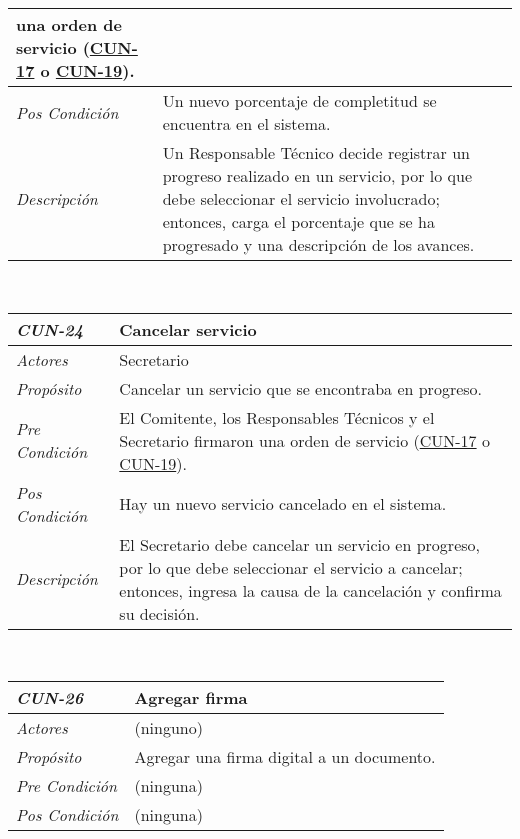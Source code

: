 \begin{center}
{\begin{tabular}{ | p{3cm} | p{12.5cm} | }
	una orden de servicio
	(\hyperlink{CUN-17}{CUN-17} o
	\hyperlink{CUN-19}{CUN-19}). \\
	\hline
	\raggedleft \textit{Pos Condici\'on} & Un nuevo
	porcentaje de completitud se encuentra en el sistema. \\
	\hline
	\raggedleft \textit{Descripci\'on} &
	Un Responsable T\'ecnico decide registrar un progreso
	realizado en un servicio, por lo que debe
	seleccionar el servicio involucrado; entonces, carga
	el porcentaje que se ha progresado y una descripci\'on
	de los avances. \\
	\hline
\end{tabular}} \\[1cm]
\hypertarget{CUN-24}{%
\begin{tabular}{ | p{3cm} | p{12.5cm} | }
	\hline
	\rowcolor{lightgray}
	\hfil \textbf{\textit{CUN-24}} &
	\hfil \textbf{Cancelar servicio} \\
	\hline
	\raggedleft \textit{Actores} & Secretario \\
	\hline
	\raggedleft \textit{Prop\'osito} & Cancelar un
	servicio que se encontraba en progreso. \\
	\hline
	\raggedleft \textit{Pre Condici\'on} & El Comitente,
	los Responsables T\'ecnicos y el Secretario firmaron
	una orden de servicio
	(\hyperlink{CUN-17}{CUN-17} o
	\hyperlink{CUN-19}{CUN-19}). \\
	\hline
	\raggedleft \textit{Pos Condici\'on} & Hay un nuevo
	servicio cancelado en el sistema. \\
	\hline
	\raggedleft \textit{Descripci\'on} &
	El Secretario debe cancelar un servicio en progreso,
	por lo que debe seleccionar el servicio a cancelar;
	entonces, ingresa la causa de la cancelaci\'on y
	confirma su decisi\'on. \\
	\hline
\end{tabular}} \\[1cm]
\hypertarget{CUN-26}{%
\begin{tabular}{ | p{3cm} | p{12.5cm} | }
	\hline
	\rowcolor{lightgray}
	\hfil \textbf{\textit{CUN-26}} &
	\hfil \textbf{Agregar firma} \\
	\hline
	\raggedleft \textit{Actores} & (ninguno) \\
	\hline
	\raggedleft \textit{Prop\'osito} & Agregar una firma
	digital a un documento. \\
	\hline
	\raggedleft \textit{Pre Condici\'on} & (ninguna) \\
	\hline
	\raggedleft \textit{Pos Condici\'on} & (ninguna) \\

\end{tabular}}
\end{center}
